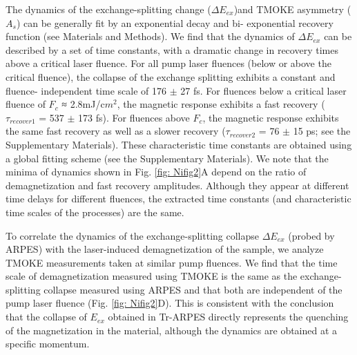 The dynamics of the exchange-splitting change ($\Delta E_{ex}$)and TMOKE asymmetry ($A_{s}$) can be generally fit by an exponential decay and bi- exponential recovery function (see Materials and Methods). We find that the dynamics of $\Delta E_{ex}$ can be described by a set of time constants, with a dramatic change in recovery times above a critical laser fluence. For all pump laser fluences (below or above the critical fluence), the collapse of the exchange splitting exhibits a constant and fluence- independent time scale of 176 $\pm$ 27 fs. For fluences below a critical laser fluence of $F_{c}$ ≈ 2.8mJ/c$m^2$, the magnetic response exhibits a fast recovery ($\tau_{recover1}$ = 537 $\pm$ 173 fs). For fluences above $F_c$, the magnetic response exhibits the same fast recovery as well as a slower recovery ($\tau_{recover2}$ = 76 $\pm$ 15 ps; see the Supplementary Materials). These characteristic time constants are obtained using a global fitting scheme (see the Supplementary Materials). We note that the minima of dynamics shown in Fig. \ref{fig: Nifig2}A depend on the ratio of demagnetization and fast recovery amplitudes. Although they appear at different time delays for different fluences, the extracted time constants (and characteristic time scales of the processes) are the same. 

To correlate the dynamics of the exchange-splitting collapse $\Delta E_{ex}$ (probed by ARPES) with the laser-induced demagnetization of the sample, we analyze TMOKE measurements taken at similar pump fluences. We find that the time scale of demagnetization measured using TMOKE is the same as the exchange-splitting collapse measured using ARPES and that both are independent of the pump laser fluence (Fig. \ref{fig: Nifig2}D). This is consistent with the conclusion that the collapse of $E_{ex}$ obtained in Tr-ARPES directly represents the quenching of the magnetization in the material, although the dynamics are obtained at a specific momentum. 

